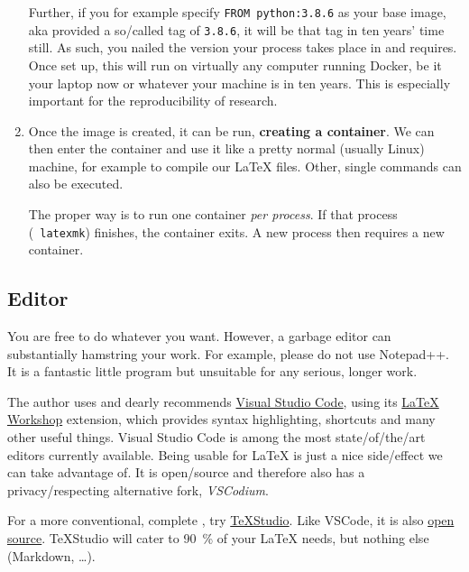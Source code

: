 \begin{enumerate}
        Further, if you for example specify \texttt{FROM python:3.8.6}
        as your base image, aka provided a so\-/called tag of \texttt{3.8.6}, it will be that tag in ten years' time still.
        As such, you nailed the version your process takes place in and requires.
        Once set up, this will run on virtually any computer running Docker, be it your
        laptop now or whatever your machine is in ten years.
        This is especially important for the reproducibility of research.
    \item Once the image is created, it can be run, \textbf{creating a container}.
        We can then enter the container and use it like a pretty normal (usually Linux)
        machine, for example to compile our \LaTeX{} files.
        Other, single commands can also be executed.

        The proper way is to run one container \emph{per process}.
        If that process (\ \texttt{latexmk}) finishes, the container exits.
        A new process then requires a new container.
\end{enumerate}

\subsection{Editor}
\label{ch:editor}

You are free to do whatever you want.
However, a garbage editor can substantially hamstring your work.
For example, please do not use Notepad++.
It is a fantastic little program but unsuitable for any serious, longer work.

The author uses and dearly recommends \href{https://code.visualstudio.com/}{Visual Studio Code},
using its
\href{https://marketplace.visualstudio.com/items?itemName=James-Yu.latex-workshop}{\LaTeX{} Workshop} extension, which provides syntax highlighting, shortcuts and many other useful things.
Visual Studio Code is among the most state\-/of\-/the\-/art editors currently available.
Being usable for \LaTeX{} is just a nice side\-/effect we can take advantage of.
It is open\-/source and therefore also has a privacy\-/respecting alternative fork, \emph{VSCodium}.

For a more conventional, complete ,
try \href{https://www.texstudio.org/}{TeXStudio}.
Like VSCode, it is also
\href{https://github.com/texstudio-org/texstudio}{open source}.
TeXStudio will cater to \qty{90}{\percent} of your \LaTeX{} needs, but nothing else (Markdown, \dots{}).

